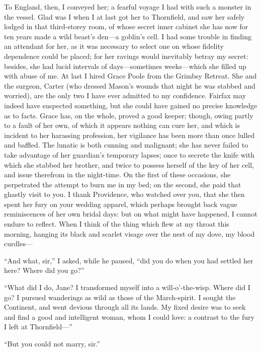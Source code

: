 {	%
	To England, then, I conveyed her; a fearful voyage I had with
	such a monster in the vessel. Glad was I when I at last got her to
	Thornfield, and saw her safely lodged in that third-storey room, of
	whose secret inner cabinet she has now for ten years made a wild beast's
	den---a goblin's cell. I had some trouble in finding an attendant for
	her, as it was necessary to select one on whose fidelity dependence
	could be placed; for her ravings would inevitably betray my secret:
	besides, she had lucid intervals of days---sometimes weeks---which she
	filled up with abuse of me. At last I hired Grace Poole from the
	Grimbsy Retreat. She and the surgeon, Carter (who dressed Mason's
	wounds that night he was stabbed and worried), are the only two I have
	ever admitted to my confidence. \Mrs{} Fairfax may indeed have suspected
	something, but she could have gained no precise knowledge as to facts.
	Grace has, on the whole, proved a good keeper; though, owing partly to a
	fault of her own, of which it appears nothing can cure her, and which is
	incident to her harassing profession, her vigilance has been more than
	once lulled and baffled. The lunatic is both cunning and malignant; she
	has never failed to take advantage of her guardian's temporary lapses;
	once to secrete the knife with which she stabbed her brother, and twice
	to possess herself of the key of her cell, and issue therefrom in the
	night-time. On the first of these occasions, she perpetrated the
	attempt to burn me in my bed; on the second, she paid that ghastly visit
	to you. I thank Providence, who watched over you, that she then spent
	her fury on your wedding apparel, which perhaps brought back vague
	reminiscences of her own bridal days: but on what might have happened, I
	cannot endure to reflect. When I think of the thing which flew at my
	throat this morning, hanging its black and scarlet visage over the nest
	of my dove, my blood curdles---}

\enquote{And what, sir,} I asked, while he paused, \enquote{did you do
	when you had settled her here? Where did you go?}

\enquote{What did I do, Jane? I transformed myself into a
	will-o'-the-wisp. Where did I go? I pursued wanderings as wild as
	those of the March-spirit. I sought the Continent, and went devious
	through all its lands. My fixed desire was to seek and find a good and
	intelligent woman, whom I could love: a contrast to the fury I left at
	Thornfield---}

\enquote{But you could not marry, sir.}

